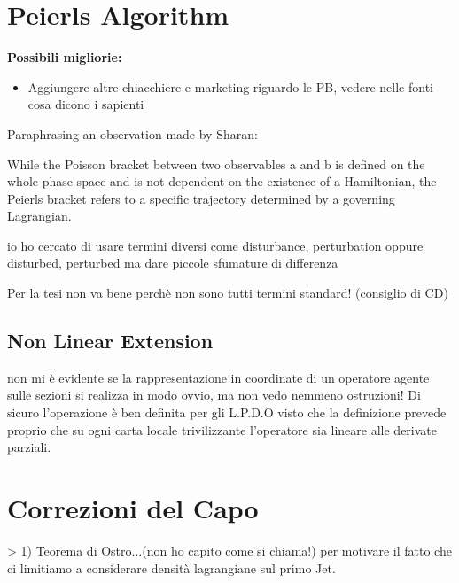 \documentclass[Main]{subfiles}
\begin{document}
	\section{Peierls Algorithm}
		\begin{Warning}
			\textbf{Possibili migliorie:}
				\begin{itemize}
					\item Aggiungere altre chiacchiere e marketing riguardo le  PB, vedere nelle fonti cosa dicono i sapienti
					\end{itemize}
		\end{Warning}
			\begin{observation}
		\begin{Warning}
	Paraphrasing an observation made by Sharan\cite{Sharan2010}:
	
	
		
	While the Poisson bracket between two observables a and b is defined on the whole phase space and is not dependent on the existence of a Hamiltonian, the Peierls bracket refers to a specific trajectory determined by a governing Lagrangian. 
	
	\end{Warning}
	\end{observation}	
	
	\begin{Warning}
		io ho cercato di usare termini diversi come disturbance, perturbation oppure disturbed, perturbed
		ma dare piccole sfumature di differenza
		
		Per la tesi non va bene perchè non sono tutti termini standard! (consiglio di CD)
	\end{Warning}
	
	\subsection{Non Linear Extension}
		non mi è evidente se la rappresentazione in coordinate di un operatore agente sulle sezioni si realizza in modo ovvio, ma non vedo nemmeno ostruzioni! Di sicuro l'operazione è ben definita per gli L.P.D.O visto che la definizione prevede proprio che su ogni carta locale trivilizzante l'operatore sia lineare alle derivate parziali.
	
	\section{Correzioni del Capo}
	>   1) Teorema di Ostro...(non ho capito come si chiama!) per motivare il fatto che ci limitiamo a considerare densità lagrangiane sul primo Jet.
\end{document}
